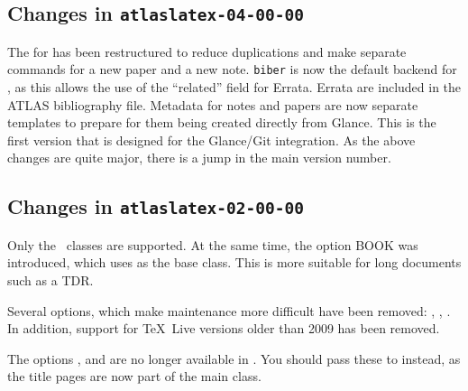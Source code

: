 \subsection{Changes in \texttt{atlaslatex-04-00-00}}
\label{sec:atlaslatex4}

 The  for 
has been restructured to reduce duplications and make separate commands for a new paper and a new note.
\texttt{biber} is now the default backend for ,
as this allows the use of the \enquote{related} field for Errata.
Errata are included in the ATLAS bibliography file.
Metadata for notes and papers are now separate templates to prepare for them being created directly from Glance.
This is the first version that is designed for the Glance/Git integration.
As the above changes are quite major, there is a jump in the main version number.


\subsection{Changes in \texttt{atlaslatex-02-00-00}}
\label{sec:atlaslatex2}

 Only the \KOMAScript\ classes are supported.
At the same time, the option BOOK was introduced, which uses  as the base class.
This is more suitable for long documents such as a TDR.

Several options, which make maintenance more difficult have been removed:
, , .
In addition, support for \TeX\ Live versions older than 2009 has been removed.

The options ,  and  are no longer available
in .
You should pass these to  instead, as the title pages are now part of the main class.



